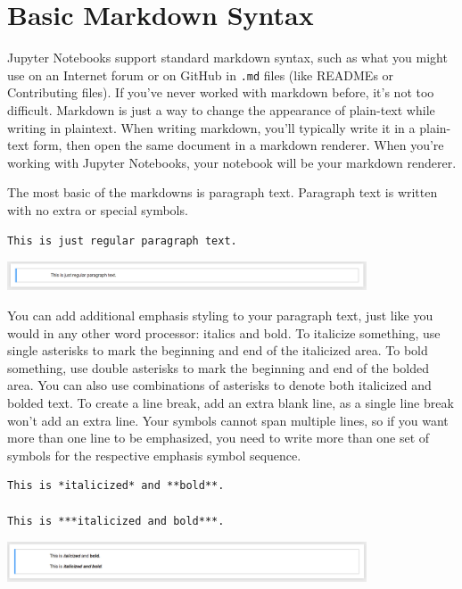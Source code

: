 \section{Basic Markdown Syntax}
Jupyter Notebooks support standard markdown syntax, such as what you might use on an Internet forum or on GitHub in \verb|.md| files (like READMEs or Contributing files). If you've never worked with markdown before, it's not too difficult. Markdown is just a way to change the appearance of plain-text while writing in plaintext. When writing markdown, you'll typically write it in a plain-text form, then open the same document in a markdown renderer. When you're working with Jupyter Notebooks, your notebook will be your markdown renderer.\par
The most basic of the markdowns is paragraph text. Paragraph text is written with no extra or special symbols.
\begin{lstlisting}
This is just regular paragraph text.
\end{lstlisting}

\includegraphics[width=0.8\textwidth]{img/mdparagraph.png}

You can add additional emphasis styling to your paragraph text, just like you would in any other word processor: italics and bold. To italicize something, use single asterisks to mark the beginning and end of the italicized area. To bold something, use double asterisks to mark the beginning and end of the bolded area. You can also use combinations of asterisks to denote both italicized and bolded text. To create a line break, add an extra blank line, as a single line break won't add an extra line. Your symbols cannot span multiple lines, so if you want more than one line to be emphasized, you need to write more than one set of symbols for the respective emphasis symbol sequence.\par
\begin{lstlisting}
This is *italicized* and **bold**.

This is ***italicized and bold***.
\end{lstlisting}
\par

\includegraphics[width=0.8\textwidth]{img/mditalicbold.png}

